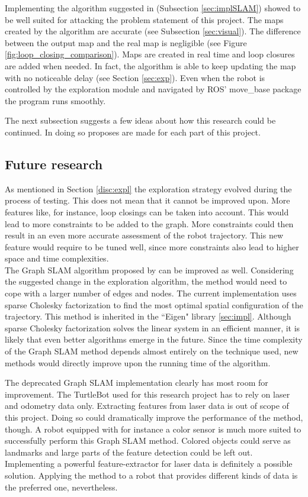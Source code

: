 \documentclass{ba-kecs}
\begin{document}
Implementing the algorithm suggested in \citep{Grisetti} (Subsection \ref{sec:implSLAM}) showed to be well suited for attacking the problem statement of this project. The maps created by the algorithm are accurate (see Subsection \ref{sec:visual}). The difference between the output map and the real map is negligible (see Figure \ref{fig:loop_closing_comparison}). Maps are created in real time and loop closures are added when needed. In fact, the algorithm is able to keep updating the map with no noticeable delay (see Section \ref{sec:exp}). Even when the robot is controlled by the exploration module and navigated by ROS' move\_base package the program runs smoothly.

The next subsection suggests a few ideas about how this research could be continued. In doing so proposes are made for each part of this project.

\subsection{Future research}
As mentioned in Section \ref{disc:expl} the exploration strategy evolved during the process of testing. This does not mean that it cannot be improved upon. More features like, for instance, loop closings can be taken into account. This would lead to more constraints to be added to the graph. More constraints could then result in an even more accurate assessment of the robot trajectory. This new feature would require to be tuned well, since more constraints also lead to higher space and time complexities. 
\\

The Graph SLAM algorithm proposed by \citep{Grisetti} can be improved as well. Considering the suggested change in the exploration algorithm, the method would need to cope with a larger number of edges and nodes.
The current implementation uses sparse Cholesky factorization to find the most optimal spatial configuration of the trajectory. This method is inherited in the ``Eigen" library \ref{sec:impl}. Although sparse Cholesky factorization solves the linear system in an efficient manner, it is likely that even better algorithms emerge in the future. Since the time complexity of the Graph SLAM method depends almost entirely on the technique used, new methods would directly improve upon the running time of the algorithm.

The deprecated Graph SLAM implementation clearly has most room for improvement. The TurtleBot used for this research project has to rely on laser and odometry data only. Extracting features from laser data is out of scope of this project. Doing so could dramatically improve the performance of the method, though. 
A robot equipped with for instance a color sensor is much more suited to successfully perform this Graph SLAM method. Colored objects could serve as landmarks and large parts of the feature detection could be left out. Implementing a powerful feature-extractor for laser data is definitely a possible solution. Applying the method to a robot that provides different kinds of data is the preferred one, nevertheless.
\end{document}
